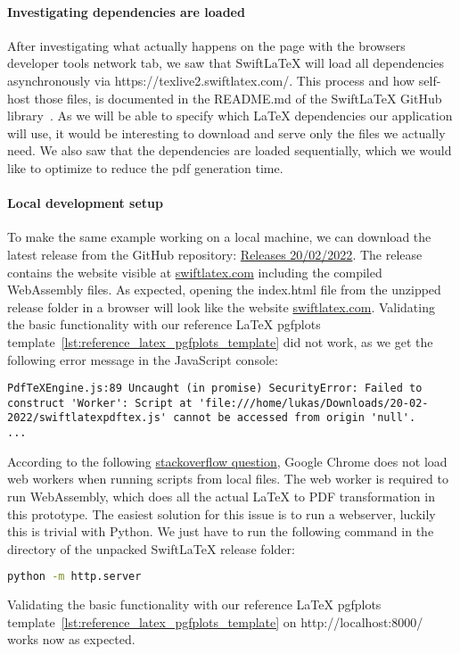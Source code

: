 \paragraph{Investigating dependencies are loaded}\mbox{}\newline
After investigating what actually happens on the page with the browsers developer tools network tab, we saw that SwiftLaTeX will load all dependencies asynchronously via https://texlive2.swiftlatex.com/.
This process and how self-host those files, is documented in the README.md of the SwiftLaTeX GitHub library~\cite{swiftlatex_github_repository}.
As we will be able to specify which LaTeX dependencies our application will use, it would be interesting to download and serve only the files we actually need.
We also saw that the dependencies are loaded sequentially, which we would like to optimize to reduce the pdf generation time.

\paragraph{Local development setup}\mbox{}\newline
To make the same example working on a local machine, we can download the latest release from the GitHub repository: \href{https://github.com/SwiftLaTeX/SwiftLaTeX/releases/tag/v20022022}{Releases 20/02/2022}.
The release contains the website visible at \href{https://www.swiftlatex.com/}{swiftlatex.com} including the compiled WebAssembly files.
As expected, opening the index.html file from the unzipped release folder in a browser will look like the website \href{https://www.swiftlatex.com/}{swiftlatex.com}.
Validating the basic functionality with our reference LaTeX pgfplots template~\ref{lst:reference_latex_pgfplots_template} did not work, as we get the following error message in the JavaScript console:
\begin{lstlisting}[caption={SwiftLaTeX local development setup: JavaScript error message},label={lst:swiftlatex_local_setup_js_error}]
PdfTeXEngine.js:89 Uncaught (in promise) SecurityError: Failed to construct 'Worker': Script at 'file:///home/lukas/Downloads/20-02-2022/swiftlatexpdftex.js' cannot be accessed from origin 'null'.
...
\end{lstlisting}

According to the following \href{https://stackoverflow.com/questions/21408510/chrome-cant-load-web-worker}{stackoverflow question}, Google Chrome does not load web workers when running scripts from local files.
The web worker is required to run WebAssembly, which does all the actual LaTeX to PDF transformation in this prototype.
The easiest solution for this issue is to run a webserver, luckily this is trivial with Python.
We just have to run the following command in the directory of the unpacked SwiftLaTeX release folder:
\begin{lstlisting}[caption={Start a webserver on http://localhost:8000/ with Python},language=bash,label={lst:lstlisting}]
python -m http.server
\end{lstlisting}
Validating the basic functionality with our reference LaTeX pgfplots template~\ref{lst:reference_latex_pgfplots_template} on http://localhost:8000/ works now as expected.

